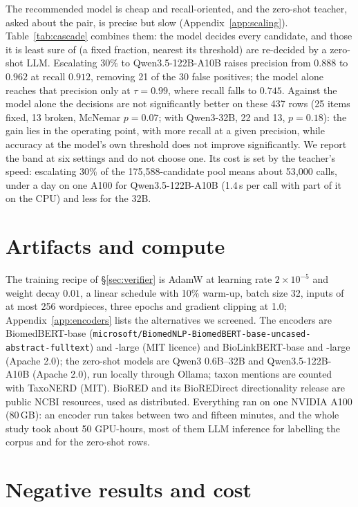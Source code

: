 \documentclass[11pt]{article}
\begin{document}
The recommended model is cheap and recall-oriented, and the zero-shot teacher, asked about the pair,
is precise but slow (Appendix~\ref{app:scaling}). Table~\ref{tab:cascade} combines them: the model
decides every candidate, and those it is least sure of (a fixed fraction, nearest its threshold) are
re-decided by a zero-shot LLM. Escalating $30\%$ to Qwen3.5-122B-A10B raises precision from $0.888$ to
$0.962$ at recall $0.912$, removing 21 of the 30 false positives; the model alone reaches that
precision only at $\tau = 0.99$, where recall falls to $0.745$. Against the model alone the
decisions are not significantly better on these 437 rows (25 items fixed, 13 broken,
McNemar $p = 0.07$; with Qwen3-32B, 22 and 13, $p = 0.18$): the gain lies in the operating point, with more recall at a given precision, while accuracy at the model's own threshold does not improve significantly. We report the band at six settings and do not choose one. Its cost is set by the
teacher's speed: escalating $30\%$ of the 175{,}588-candidate pool means about 53{,}000 calls, under
a day on one A100 for Qwen3.5-122B-A10B (1.4\,s per call with part of it on the CPU) and less for the 32B.

\section{Artifacts and compute}
\label{app:artifacts}

The training recipe of \S\ref{sec:verifier} is AdamW at learning rate $2\times10^{-5}$ and weight
decay $0.01$, a linear schedule with 10\% warm-up, batch size 32, inputs of at most 256 wordpieces,
three epochs and gradient clipping at 1.0; Appendix~\ref{app:encoders} lists the alternatives we
screened. The encoders are BiomedBERT-base
(\texttt{microsoft/\allowbreak BiomedNLP-\allowbreak BiomedBERT-\allowbreak base-\allowbreak uncased-\allowbreak abstract-\allowbreak fulltext})
and -large (MIT licence) and BioLinkBERT-base and -large (Apache 2.0); the zero-shot models are Qwen3 0.6B--32B and Qwen3.5-122B-A10B \citep{qwen2026qwen35} (Apache 2.0), run locally through
Ollama; taxon mentions are counted with TaxoNERD (MIT). BioRED and its BioREDirect directionality
release are public NCBI resources, used as distributed. Everything ran on one NVIDIA A100 (80\,GB):
an encoder run takes between two and fifteen minutes, and the whole study took about 50 GPU-hours,
most of them LLM inference for labelling the corpus and for the zero-shot rows.

\section{Negative results and cost}
\label{sec:negative}
\end{document}
